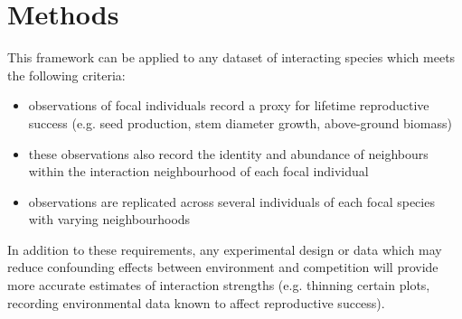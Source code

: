 \documentclass[a4,12pt]{article}
\begin{document}

    
  
    
    \section{Methods}
    
    This framework can be applied to any dataset of interacting species which meets the following criteria: 
    \begin{itemize}
        \item observations of focal individuals record a proxy for lifetime reproductive success (e.g. seed production, stem diameter growth, above-ground biomass)
        \item these observations also record the identity and abundance of neighbours within the interaction neighbourhood of each focal individual
        \item observations are replicated across several individuals of each focal species with varying neighbourhoods
    \end{itemize}
    In addition to these requirements, any experimental design or data which may reduce confounding effects between environment and competition will provide more accurate estimates of interaction strengths (e.g. thinning certain plots, recording environmental data known to affect reproductive success). 
    
\end{document}
